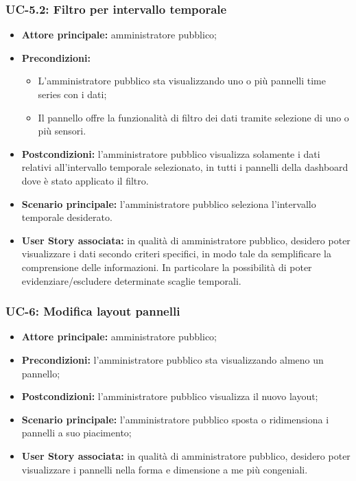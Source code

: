\documentclass[8pt]{article}
\begin{document}
\subsubsection*{UC-5.2: Filtro per intervallo temporale}
\begin{itemize}
    \item \textbf{Attore principale:} amministratore pubblico;
    \item \textbf{Precondizioni:}
    \begin{itemize}
        \item L’amministratore pubblico sta visualizzando uno o più pannelli time series con i dati;
        \item Il pannello offre la funzionalità di filtro dei dati tramite selezione di uno o più sensori.
    \end{itemize}
    \item \textbf{Postcondizioni:} l’amministratore pubblico visualizza solamente i dati relativi all’intervallo
temporale selezionato, in tutti i pannelli della dashboard dove è stato applicato il filtro.
    \item \textbf{Scenario principale: }l’amministratore pubblico seleziona l’intervallo temporale desiderato.
    \item \textbf{User Story associata:} in qualità di amministratore pubblico, desidero poter
        visualizzare i dati secondo criteri specifici, in modo tale da semplificare la comprensione
        delle informazioni. In particolare la possibilità di poter evidenziare/escludere determinate
        scaglie temporali.
\end{itemize}
\subsubsection*{UC-6: Modifica layout pannelli}
\begin{itemize}
    \item \textbf{Attore principale:} amministratore pubblico;
    \item \textbf{Precondizioni:} l'amministratore pubblico sta visualizzando almeno un pannello;
    \item \textbf{Postcondizioni:} l’amministratore pubblico visualizza il nuovo layout;
    \item \textbf{Scenario principale: }l’amministratore pubblico sposta o ridimensiona i pannelli a
        suo piacimento;
    \item \textbf{User Story associata:} in qualità di amministratore pubblico, desidero poter
        visualizzare i pannelli nella forma e dimensione a me più congeniali.
\end{itemize}
\end{document}
